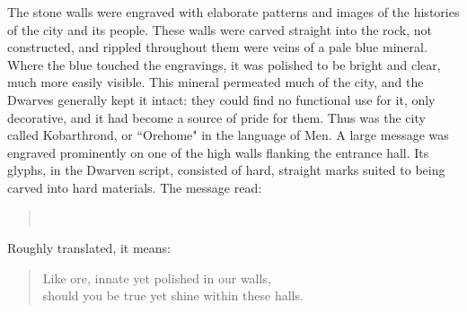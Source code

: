 The stone walls were engraved with elaborate patterns and images of the histories of the city and its people.  These walls were carved straight into the rock, not constructed, and rippled throughout them were veins of a pale blue mineral.  Where the blue touched the engravings, it was polished to be bright and clear, much more easily visible.  This mineral permeated much of the city, and the Dwarves generally kept it intact: they could find no functional use for it, only decorative, and it had become a source of pride for them.  Thus was the city called Kobarthrond, or ``Orehome" in the language of Men.  A large message was engraved prominently on one of the high walls flanking the entrance hall.  Its glyphs, in the Dwarven script, consisted of hard, straight marks suited to being carved into hard materials.  The message read:
\begin{verse}
\\
\end{verse}
Roughly translated, it means:
\begin{verse}
Like ore, innate yet polished in our walls,\\
should you be true yet shine within these halls.
\end{verse}
